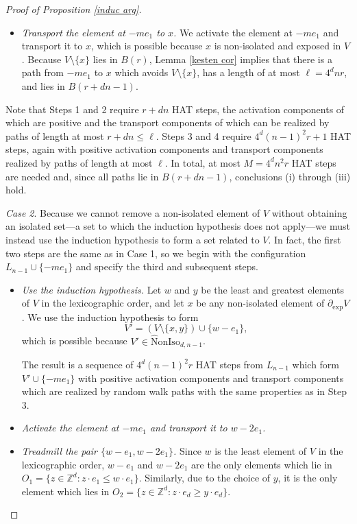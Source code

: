 \documentclass[11pt,reqno]{amsart}
\theoremstyle{definition}
\numberwithin{equation}{section}
\newcommand{\Z}{\mathbb{Z}}
\newcommand{\1}{\mathbf{1}}
\newcommand{\wtnoniso}{\mathrm{\wt{N}onIso}}
\newcommand{\wt}{\widehat}
\newcommand{\bdye}{\partial_{\mathrm{exp}}}
\begin{document}
\begin{proof}[Proof of Proposition \ref{induc arg}]
\begin{itemize}
 \item[Step 4:] {\em Transport the element at $-m e_1$ to $x$.} We activate the element at $-m e_1$ and transport it to $x$, which is possible because $x$ is non-isolated and exposed in $V$. Because $V{\setminus}\{x\}$ lies in $B(r)$, Lemma \ref{kesten cor} implies that there is a path from $-m e_1$ to $x$ which avoids $V{\setminus}\{x\}$, has a length of at most $\ell = 4^d n r$, and lies in $B(r+dn-1)$.
 \end{itemize}

Note that Steps 1 and 2 require $r+dn$ HAT steps, the activation components of which are positive and the transport components of which can be realized by paths of length at most $r+dn \leq \ell$. Steps 3 and 4 require $4^d(n-1)^2 r + 1$ HAT steps, again with positive activation components and transport components realized by paths of length at most $\ell$. In total, at most $M = 4^d n^2 r$ HAT steps are needed and, since all paths lie in $B(r+dn-1)$, conclusions (i) through (iii) hold.

{\em Case 2}. Because we cannot remove a non-isolated element of $V$ without obtaining an isolated set---a set to which the induction hypothesis does not apply---we must instead use the induction hypothesis to form a set related to $V$. In fact, the first two steps are the same as in Case 1, so we begin with the configuration $L_{n-1} \cup \{-m e_1\}$ and specify the third and subsequent steps.

\begin{itemize}
\item[Step 3':] {\em Use the induction hypothesis.} Let $w$ and $y$ be the least and greatest elements of $V$ in the lexicographic order, and let $x$ be any non-isolated element of $\bdye V$. We use the induction hypothesis to form
\[
V' = (V {\setminus} \{x,y\}) \cup \{w-e_1\},
\]
which is possible because $V' \in \wtnoniso_{d,n-1}$.

 The result is a sequence of $4^d(n-1)^2 r$ HAT steps from $L_{n-1}$ which form $V' \cup \{-m e_1\}$ with positive activation components and transport components which are realized by random walk paths with the same properties as in Step 3.

\item[Step 4':] {\em Activate the element at $-m e_1$ and transport it to $w-2e_1$.} 

\item[Step 5':] {\em Treadmill the pair $\{w-e_1,w-2e_1\}$.} Since $w$ is the least element of $V$ in the lexicographic order, $w-e_1$ and $w-2e_1$ are the only elements which lie in $O_1 = \{ z \in \Z^d: z \cdot e_1 \leq w \cdot e_1\}$. Similarly, due to the choice of $y$, it is the only element which lies in $O_2 = \{ z \in \Z^d: z \cdot e_d \geq y \cdot e_d\}$. 


\end{itemize}
\end{proof}
\end{document}
